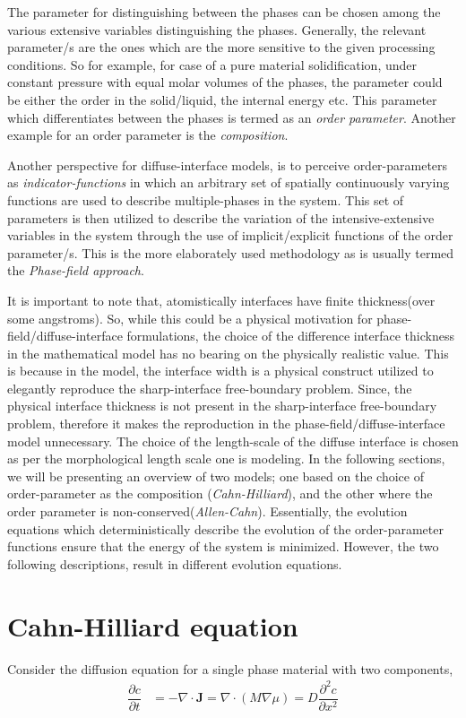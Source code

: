 \documentclass[english]{iambook}
\begin{document}
The parameter for distinguishing between the phases can be chosen 
among the various extensive variables distinguishing the phases.
Generally, the relevant parameter/s are the ones which are the more
sensitive to the given processing conditions. So for example, for 
case of a pure material solidification, under constant pressure
with equal molar volumes of the phases, the parameter could be 
either the order in the solid/liquid, the internal energy etc.
This parameter which differentiates between the phases is termed
as an \textit{order parameter}. Another example for an 
order parameter is the \textit{composition}.

Another perspective for diffuse-interface models, is to
perceive order-parameters as \textit{indicator-functions}
in which an arbitrary set of spatially continuously varying
functions are used to describe multiple-phases in the system.
This set of parameters is then utilized to describe the variation of
the intensive-extensive variables in the system through the
use of implicit/explicit functions of the order parameter/s.
This is the more elaborately used methodology as is usually
termed the \textit{Phase-field approach}.

It is important to note that, atomistically interfaces
have finite thickness(over some angstroms). So, while this
could be a physical motivation for phase-field/diffuse-interface
formulations, the choice of the difference interface thickness
in the mathematical model has no bearing on the physically 
realistic value. This is because in the model, 
the interface width is a physical construct utilized to elegantly
reproduce the sharp-interface free-boundary problem. Since, 
the physical interface thickness is not present in the 
sharp-interface free-boundary problem, therefore it makes 
the reproduction in the phase-field/diffuse-interface model
unnecessary. The choice of the length-scale of the diffuse
interface is chosen as per the morphological length scale
one is modeling. In the following sections, we will be 
presenting an overview of two models; one based on the 
choice of order-parameter as the composition (\textit{Cahn-Hilliard}), and the 
other where the order parameter is non-conserved(\textit{Allen-Cahn}). Essentially, 
the evolution equations which deterministically describe
the evolution of the order-parameter functions ensure that
the energy of the system is minimized. However, the two 
following descriptions, result in different evolution equations.

\section{Cahn-Hilliard equation}
Consider the diffusion equation for a single phase
material with two components,
\begin{align}
 \dfrac{\partial c}{\partial t} &= -\nabla\cdot\mathbf{J} = \nabla\cdot\left(M\nabla\mu\right) = D\dfrac{\partial ^{2}c}{\partial x^{2}}
\end{align}
\end{document}

